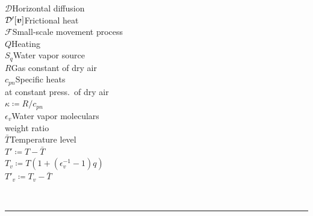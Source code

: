 \documentclass[aspectratio=149,9pt,fleqn,tbtags]{beamer}
\begin{document}
\begin{frame}
\begin{columns}
\begin{column}{.45\textwidth}
\begin{table}[b]
\begin{minipage}{\textwidth}
\begin{minipage}{.5\textwidth}
\begin{tabbing}
							\(\mathcal{D}\)\>Horizontal diffusion\\
							\(\mathcal{D}'[\vb*{v}]\)\>Frictional heat\\
							\(\mathcal{F}\)\>Small-scale movement process\\
							\(Q\)\>Heating\\
							\(S_q\)\>Water vapor source\\
							\(R\)\>Gas constant of dry air\\
							\(c_{pn}\)\>Specific heats\\
							\>at constant press.~of dry air\\
							\(\kappa\coloneqq R/c_{pn}\)\\
							\(\epsilon_v\)\>Water vapor moleculars\\
							\>weight ratio\\
							\(\bar T\)\>Temperature level\\
							\(T'\coloneqq T-\bar T\)\\
							\(T_v\coloneqq T(1+(\epsilon_v^{-1}-1)q)\)\\
							\(T'_v\coloneqq T_v-\bar T\)
						\end{tabbing}
					\end{minipage}\\
					\rule[0pt]{\textwidth}{\heavyrulewidth}
				\end{minipage}
			\end{table}
		\end{column}
	\end{columns}
\end{frame}
\end{document}
